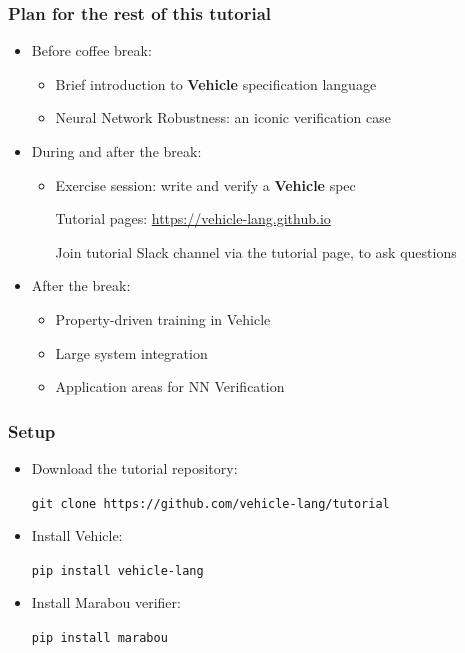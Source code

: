 \documentclass[t,compress,aspectratio=169]{beamer}
\begin{document}
\begin{frame}
\frametitle{Plan for the rest of this tutorial}

\begin{itemize}
\item Before coffee break:
\begin{itemize}
\item Brief introduction to \textbf{Vehicle} specification language
\item Neural Network Robustness: an iconic verification case


\end{itemize}

\item During and after the break:

\begin{itemize}
\item \alert{Exercise session:} write and verify a \textbf{Vehicle} spec

\footnotesize{Tutorial pages: \url{https://vehicle-lang.github.io}}

Join tutorial Slack channel via the tutorial page, to ask questions
\end{itemize}

\item After the break:
\begin{itemize}
\item Property-driven training in Vehicle
\item Large system integration
\item Application areas for NN Verification
\end{itemize}
\end{itemize}
\end{frame}

\begin{frame}
\frametitle{Setup}

\begin{itemize}
\item Download the tutorial repository:
\begin{center}
\texttt{git clone https://github.com/vehicle-lang/tutorial}
\end{center}
\vspace{1em}

\item Install Vehicle:
\begin{center}
\texttt{pip install vehicle-lang}
\end{center}
\vspace{1em}

\item Install Marabou verifier:
\begin{center}
\texttt{pip install marabou}
\end{center}

\end{itemize}
\end{frame}
\end{document}

